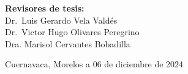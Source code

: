\begin{titlepage}
\begin{minipage}{0.52\textwidth}
\begin{flushright}
\begin{center}
            \textbf{Revisores de tesis:}\\
    
            Dr.\ Luis Gerardo Vela Valdés\\
            Dr.\ Victor Hugo Olivares Peregrino\\
            Dra. Marisol Cervantes Bobadilla\\
    
            
    \end{center}
    \end{flushright}
    \end{minipage}	
    \vspace*{3cm}
    
    \begin{flushright}
    {\large Cuernavaca, Morelos a 06 de diciembre de 2024}
    \end{flushright}
    
    \end{titlepage}
